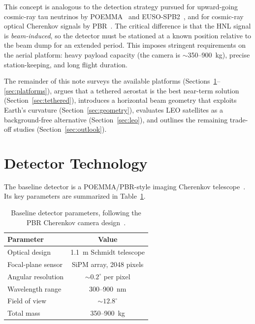 \documentclass[11pt]{article}
\begin{document}
This concept is analogous to the detection strategy pursued for
upward-going cosmic-ray tau neutrinos by POEMMA~\cite{POEMMA}
and EUSO-SPB2~\cite{EUSO-SPB2-mission}, and for cosmic-ray
optical Cherenkov signals by PBR~\cite{PBR-mission}.  The critical
difference is that the HNL signal is \emph{beam-induced}, so the
detector must be stationed at a known position relative to the beam dump
for an extended period.  This imposes stringent requirements on the
aerial platform: heavy payload capacity (the camera is $\sim$350--900~kg),
precise station-keeping, and long flight duration.

The remainder of this note surveys the available platforms
(Sections~\ref{sec:detector}--\ref{sec:platforms}), argues that a tethered
aerostat is the best near-term solution (Section~\ref{sec:tethered}),
introduces a horizontal beam geometry that exploits Earth's curvature
(Section~\ref{sec:geometry}), evaluates LEO satellites as a
background-free alternative (Section~\ref{sec:leo}), and outlines the
remaining trade-off studies (Section~\ref{sec:outlook}).


\section{Detector Technology}
\label{sec:detector}

The baseline detector is a POEMMA/PBR-style imaging Cherenkov
telescope~\cite{PBR-camera,PBR-optics,POEMMA}.  Its key parameters are
summarized in Table~\ref{tab:detector}.

\begin{table}[h]
\centering
\begin{tabular}{lc}
\toprule
\textbf{Parameter} & \textbf{Value} \\
\midrule
Optical design        & 1.1~m Schmidt telescope \\
Focal-plane sensor    & SiPM array, 2048 pixels \\
Angular resolution    & $\sim 0.2^\circ$ per pixel \\
Wavelength range      & 300--900~nm \\
Field of view         & $\sim 12.8^\circ$ \\
Total mass            & 350--900~kg \\
\bottomrule
\end{tabular}
\caption{Baseline detector parameters, following the PBR Cherenkov camera
design~\cite{PBR-camera,PBR-optics}.}
\label{tab:detector}
\end{table}
\end{document}
